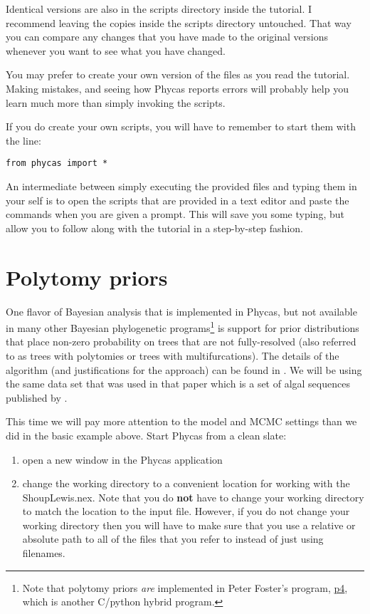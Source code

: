 \documentclass{article}
\newcommand{\phycas}{Phycas\xspace}
\newcommand{\localfile}[1]{\textsf{#1}\xspace}
\begin{document}
Identical versions are also in the \localfile{scripts} directory
inside the tutorial.
I recommend leaving the copies inside the \localfile{scripts} directory 
untouched.
That way you can compare any changes that you have made
to the original versions whenever you want to see what 
you have changed.

You may prefer to create your own version of the
files as you read the tutorial.
Making mistakes, and seeing how \phycas reports
errors will probably help you learn much more 
than simply invoking the scripts.

If you do create your own scripts, you will have to remember
to start them with the line:
\begin{verbatim}
from phycas import *
\end{verbatim}

An intermediate between simply executing the provided files
and typing them in your self is to open the scripts that are provided in
a text editor and paste the commands when you are given 
a prompt.
This will save you some typing, but allow you to follow 
along with the tutorial in a step-by-step fashion.

\section{Polytomy priors}

One flavor of Bayesian analysis that is implemented in \phycas, but not available in many other Bayesian phylogenetic programs\footnote{Note that polytomy priors {\em are} implemented in Peter Foster's program, \href{http://bmnh.org/~pf/p4.html}{p4}, which is another C/python hybrid program.} is support for prior distributions that place non-zero probability on trees that are not fully-resolved (also referred to as trees with polytomies or trees with multifurcations).
The details of the algorithm (and justifications for the approach) can be found in \citet{LewisHolderHolsinger2005}.
We will be using the same data set that was used in that paper which is a set of algal sequences published by \citet{ShoupL2003}.

This time we will pay more attention to the model and MCMC settings than we did in the basic example above.
Start \phycas from a clean slate:
\begin{enumerate}
	\item open a new window in the \phycas application
	\item change the working directory to a convenient location for working with the \localfile{ShoupLewis.nex}. Note that you do {\bf not} have to change your working directory to match the location to the input file.
	However, if you do not change your working directory then you will have to make sure that you use a relative or absolute path to all of the files that you refer to instead of just using filenames.
\end{enumerate}
\end{document}
